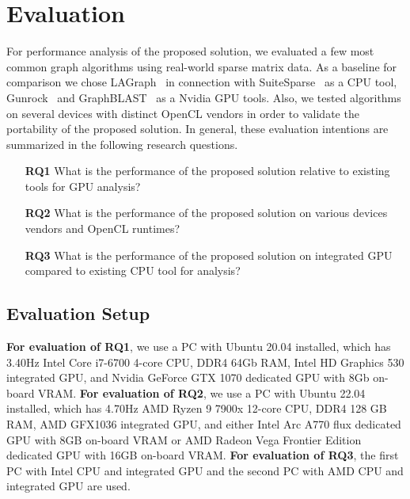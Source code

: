 \section{Evaluation}

For performance analysis of the proposed solution, we evaluated a few most common graph algorithms using real-world sparse matrix data. 
As a baseline for comparison we chose LAGraph~\cite{szarnyas2021lagraph} in connection with SuiteSparse~\cite{10.1145/3322125} as a CPU tool, Gunrock~\cite{7967137} and GraphBLAST~\cite{yang2019graphblast} as a Nvidia GPU tools. 
Also, we tested algorithms on several devices with distinct OpenCL vendors in order to validate the portability of the proposed solution. 
In general, these evaluation intentions are summarized in the following research questions. 

\vspace{0.2cm}
\begin{itemize}
    \item[\textbf{RQ1}] What is the performance of the proposed solution relative to existing tools for GPU analysis?

    \item[\textbf{RQ2}] What is the performance of the proposed solution on various devices vendors and OpenCL runtimes?

    \item[\textbf{RQ3}] What is the performance of the proposed solution on integrated GPU compared to existing CPU tool for analysis?
\end{itemize}

\subsection{Evaluation Setup}

\textbf{For evaluation of RQ1}, we use a PC with Ubuntu 20.04 installed, which has 3.40Hz Intel Core i7-6700 4-core CPU, DDR4 64Gb RAM, Intel HD Graphics 530 integrated GPU, and Nvidia GeForce GTX 1070 dedicated GPU with 8Gb on-board VRAM. 
\textbf{For evaluation of RQ2}, we use a PC with Ubuntu 22.04 installed, which has 4.70Hz AMD Ryzen 9 7900x 12-core CPU, DDR4 128 GB RAM, AMD GFX1036 integrated GPU, and either Intel Arc A770 flux dedicated GPU with 8GB on-board VRAM or AMD Radeon Vega Frontier Edition dedicated GPU with 16GB on-board VRAM.
\textbf{For evaluation of RQ3}, the first PC with Intel CPU and integrated GPU and the second PC with AMD CPU and integrated GPU are used.

